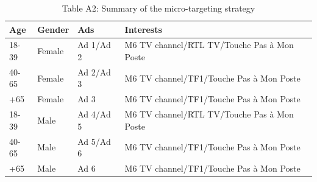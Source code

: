 \begin{table}[H]
\centering
\caption{Table A2: Summary of the micro-targeting strategy}
\centering
\begin{tabular}[t]{llll}
\toprule
Age & Gender & Ads & Interests\\
\midrule
18-39 & Female & Ad 1/Ad 2 & M6 TV channel/RTL TV/Touche Pas à Mon Poste\\
40-65 & Female & Ad 2/Ad 3 & M6 TV channel/TF1/Touche Pas à Mon Poste\\
+65 & Female & Ad 3 & M6 TV channel/TF1/Touche Pas à Mon Poste\\
18-39 & Male & Ad 4/Ad 5 & M6 TV channel/RTL TV/Touche Pas à Mon Poste\\
40-65 & Male & Ad 5/Ad 6 & M6 TV channel/TF1/Touche Pas à Mon Poste\\
\addlinespace
+65 & Male & Ad 6 & M6 TV channel/TF1/Touche Pas à Mon Poste\\
\bottomrule
\end{tabular}
\end{table}
